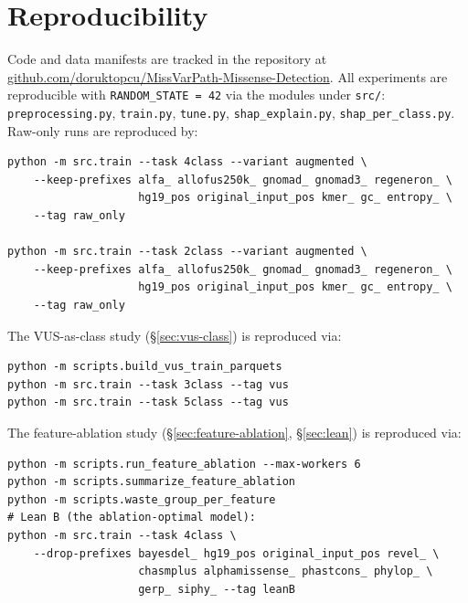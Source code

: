 \documentclass[11pt,a4paper]{article}
\begin{document}
\section*{Reproducibility}

\noindent
Code and data manifests are tracked in the repository at
\href{https://github.com/doruktopcu/MissVarPath-Missense-Detection}{github.com/doruktopcu/MissVarPath-Missense-Detection}.
All experiments are reproducible with \texttt{RANDOM\_STATE = 42} via the modules
under \texttt{src/}:
\texttt{preprocessing.py}, \texttt{train.py}, \texttt{tune.py},
\texttt{shap\_explain.py}, \texttt{shap\_per\_class.py}. Raw-only runs are reproduced
by:
\begin{lstlisting}[basicstyle=\small\ttfamily,breaklines=true]
python -m src.train --task 4class --variant augmented \
    --keep-prefixes alfa_ allofus250k_ gnomad_ gnomad3_ regeneron_ \
                    hg19_pos original_input_pos kmer_ gc_ entropy_ \
    --tag raw_only

python -m src.train --task 2class --variant augmented \
    --keep-prefixes alfa_ allofus250k_ gnomad_ gnomad3_ regeneron_ \
                    hg19_pos original_input_pos kmer_ gc_ entropy_ \
    --tag raw_only
\end{lstlisting}

\noindent
The VUS-as-class study (\S\ref{sec:vus-class}) is reproduced via:
\begin{lstlisting}[basicstyle=\small\ttfamily,breaklines=true]
python -m scripts.build_vus_train_parquets
python -m src.train --task 3class --tag vus
python -m src.train --task 5class --tag vus
\end{lstlisting}

\noindent
The feature-ablation study (\S\ref{sec:feature-ablation},
\S\ref{sec:lean}) is reproduced via:
\begin{lstlisting}[basicstyle=\small\ttfamily,breaklines=true]
python -m scripts.run_feature_ablation --max-workers 6
python -m scripts.summarize_feature_ablation
python -m scripts.waste_group_per_feature
# Lean B (the ablation-optimal model):
python -m src.train --task 4class \
    --drop-prefixes bayesdel_ hg19_pos original_input_pos revel_ \
                    chasmplus alphamissense_ phastcons_ phylop_ \
                    gerp_ siphy_ --tag leanB
\end{lstlisting}
\end{document}
